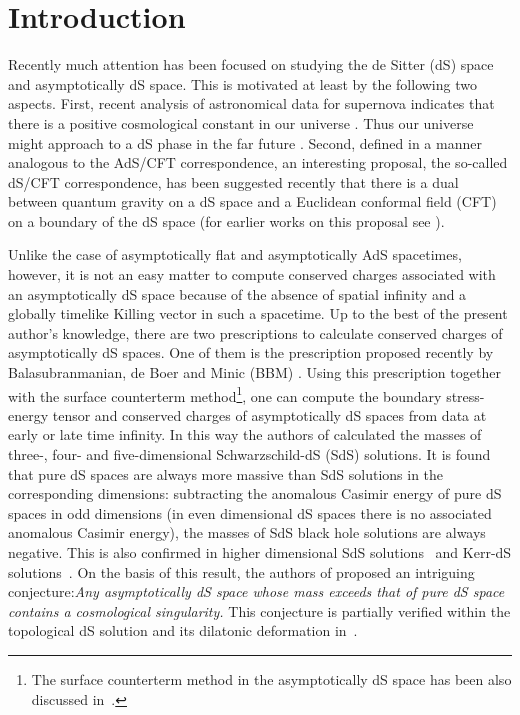\documentclass[a4paper,12pt]{article}
\providecommand{\sect}[1]{\setcounter{equation}{0}\section{#1}}
\begin{document}
\sect{Introduction}
Recently much attention has been focused on studying the de Sitter (dS) space and 
asymptotically dS space. This is motivated at least by the following two aspects.
First, recent analysis of astronomical data for supernova indicates that there is a
positive cosmological constant in our universe \cite{Per,CDS,Gar}. Thus our universe
might approach to a dS phase in the far future \cite{HKS,FKMP}. Second, defined in 
a manner analogous to the AdS/CFT correspondence, an interesting proposal, the so-called
dS/CFT correspondence, has been 
suggested recently that there is a dual between quantum gravity on a dS space and 
a Euclidean conformal field (CFT) on a boundary of the dS space \cite{Stron1}
(for earlier works on this proposal see \cite{Hull,Bala,Witten1,Mazu}).


Unlike the case of asymptotically flat and asymptotically AdS spacetimes, however,
it is not an easy matter to compute conserved charges associated with an asymptotically 
dS space because of the absence of spatial infinity and a globally timelike Killing 
vector in such a spacetime. Up to the best of the present author's knowledge, there are
two prescriptions to calculate conserved charges of asymptotically dS spaces.  One of them
is the prescription proposed  recently by Balasubranmanian, de Boer 
and Minic (BBM) \cite{BBM}. Using this prescription together with the surface counterterm 
method\footnote{The surface
counterterm method in the asymptotically dS space has been also discussed 
in~\cite{Noji1, Klem1}.}, one can compute the boundary stress-energy tensor and
conserved charges of asymptotically dS spaces from data at early or late time infinity.   
In this way the authors of \cite{BBM} calculated the masses of three-, four- and 
five-dimensional Schwarzschild-dS (SdS) solutions. It is found that pure dS spaces are 
always more massive than SdS solutions in the corresponding dimensions: subtracting the
anomalous Casimir energy of pure dS spaces in odd dimensions (in even dimensional dS spaces
there is no associated  anomalous Casimir energy), the masses of SdS black hole 
solutions are always negative. This is also confirmed in higher dimensional SdS
solutions~\cite{Mann} and Kerr-dS solutions~\cite{Dehg}.  On the basis of this result,
 the authors of \cite{BBM} proposed an intriguing conjecture:{\it Any asymptotically dS space 
whose mass exceeds that of pure dS space contains a cosmological singularity.} This conjecture is
 partially verified within the topological dS solution and its dilatonic 
deformation in~\cite{CMZ}.
\end{document}

